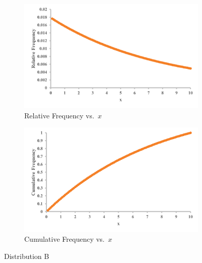 \documentclass[12pt]{article}
\begin{document}
\begin{figure}[h!]
    \centering
    \begin{subfigure}[b]{0.45\textwidth}
        \includegraphics[width=\textwidth]{graphs/DistB_Rel.png}
        \caption{Relative Frequency vs.\ \(x\)}
    \end{subfigure}
    \hfill
    \begin{subfigure}[b]{0.45\textwidth}
        \includegraphics[width=\textwidth]{graphs/DistB_Cumul.png}
        \caption{Cumulative Frequency vs.\ \(x\)}
    \end{subfigure}
    \label{fig:distB}
    \caption{Distribution B}
\end{figure}
\end{document}
